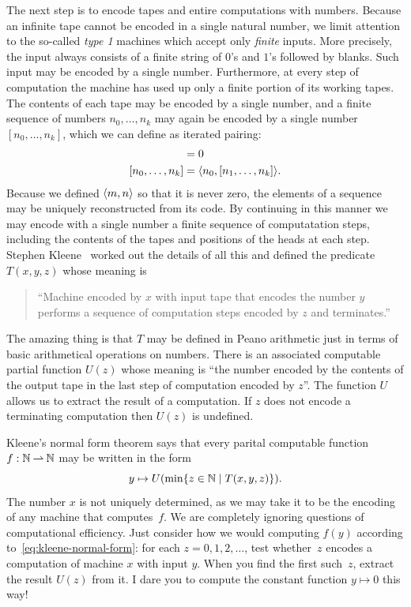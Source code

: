 The next step is to encode tapes and entire computations with numbers.
Because an infinite tape cannot be encoded in a single natural number,
we limit attention to the so-called \emph{type 1} machines which
accept only \emph{finite} inputs. More precisely, the input always
consists of a finite string of $0$'s and $1$'s followed by blanks.
Such input may be encoded by a single number. Furthermore, at every
step of computation the machine has used up only a finite portion of
its working tapes. The contents of each tape may be encoded by a
single number, and a finite sequence of numbers $n_0, \ldots, n_k$ may
again be encoded by a single number $[n_0, \ldots, n_k]$, which we can
define as iterated pairing:
%
\begin{align*}
  [] &= 0 \\
  [n_0, \ldots, n_k] &= \pair{n_0, [n_1, \ldots, n_k]}.
\end{align*}
%
Because we defined $\langle m,n \rangle$ so that it is never zero, the elements
of a sequence may be uniquely reconstructed from its code. By
continuing in this manner we may encode with a single number a finite
sequence of computatation steps, including the contents of the tapes
and positions of the heads at each step. Stephen Kleene~\cite{kleeneT}
worked out the details of all this and defined the predicate
$T(x,y,z)$ whose meaning is
%
\begin{quote}
  ``Machine encoded by $x$ with input tape that encodes the number $y$
  performs a sequence of computation steps encoded by $z$ and
  terminates.''
\end{quote}
%
The amazing thing is that $T$ may be defined in Peano arithmetic just
in terms of basic arithmetical operations on numbers. There is an
associated computable partial function $U(z)$ whose meaning is ``the
number encoded by the contents of the output tape in the last step of
computation encoded by $z$''. The function $U$ allows us to extract
the result of a computation. If $z$ does not encode a terminating
computation then $U(z)$ is undefined.

Kleene's normal form theorem says that every parital computable
function $f : \mathbb{N} \mathbin{\rightharpoonup} \mathbb{N}$ may be written in the form
%
\begin{equation}
  \label{eq:kleene-normal-form}
  y \mapsto U(\min \{z \in \mathbb{N} \mid T(x,y,z)\}).
\end{equation}
%
The number $x$ is not uniquely determined, as we may take it to be the
encoding of any machine that computes~$f$. We are completely ignoring
questions of computational efficiency. Just consider how we would
computing $f(y)$ according to~\eqref{eq:kleene-normal-form}: for each
$z = 0, 1, 2, \ldots$, test whether~$z$ encodes a computation of
machine $x$ with input $y$. When you find the first such~$z$, extract
the result $U(z)$ from it. I dare you to compute the constant function
$y \mapsto 0$ this way!

